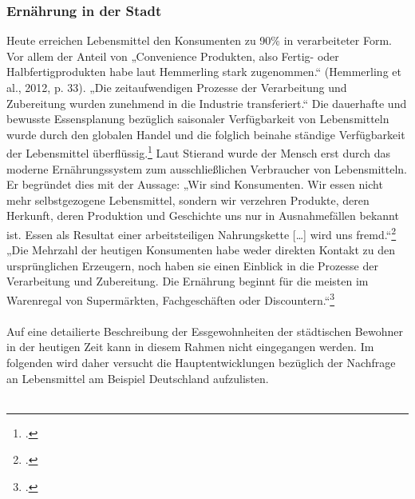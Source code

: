 \documentclass{scrartcl}
\begin{document}
\subsubsection {Ernährung in der Stadt} \label{StadtLebensmittel}
Heute erreichen Lebensmittel den Konsumenten zu 90\% in verarbeiteter Form. Vor allem der Anteil von „Convenience Produkten, also Fertig- oder Halbfertigprodukten habe laut Hemmerling stark zugenommen.“ (Hemmerling et al., 2012, p. 33). „Die zeitaufwendigen Prozesse der Verarbeitung und Zubereitung wurden zunehmend in die Industrie transferiert.“  
Die dauerhafte und bewusste Essensplanung bezüglich saisonaler Verfügbarkeit von Lebensmitteln wurde durch den globalen Handel und die folglich beinahe ständige Verfügbarkeit der Lebensmittel überflüssig.\footcite[Vgl.][S.20]{SchmidtDieVon}
Laut Stierand wurde der Mensch erst durch das moderne Ernährungssystem zum ausschließlichen Verbraucher von Lebensmitteln. Er begründet dies mit der Aussage: „Wir sind Konsumenten. Wir essen nicht mehr selbstgezogene Lebensmittel, sondern wir verzehren Produkte, deren Herkunft, deren Produktion und Geschichte uns nur in Ausnahmefällen bekannt ist. Essen als Resultat einer arbeitsteiligen Nahrungskette […] wird uns fremd.“\footcite{Spiekermann2000GesundeKulturwissenschaft} 
„Die Mehrzahl der heutigen Konsumenten habe weder direkten Kontakt zu den ursprünglichen Erzeugern, noch haben sie einen Einblick in die Prozesse der Verarbeitung und Zubereitung.
Die Ernährung beginnt für die meisten im Warenregal von Supermärkten, Fachgeschäften oder Discountern.“\footcites[S.20]{SchmidtDieVon}[Vgl.]{BerichtInhalt}\\
\\
 Auf eine detailierte Beschreibung der Essgewohnheiten der städtischen Bewohner in der heutigen Zeit kann in diesem Rahmen nicht eingegangen werden. Im folgenden wird daher versucht die Hauptentwicklungen bezüglich der Nachfrage an Lebensmittel am Beispiel Deutschland aufzulisten.\\
 \\
\end{document}
